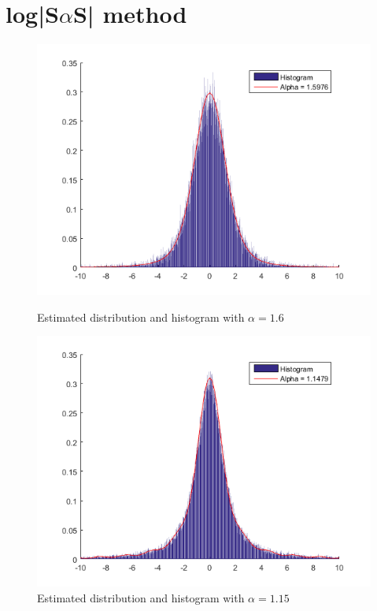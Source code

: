 \section{log|S$\alpha$S| method}
\begin{figure}[H]
    \centering
    \begin{minipage}{.5\textwidth}
        \centering
        \includegraphics[width=1\textwidth]{billeder/alpha1_6_logsas}
		\caption{Estimated distribution and histogram with $\alpha = 1.6$}
		\label{fig:logsas16}
    \end{minipage}%
    \begin{minipage}{0.5\textwidth}
        \centering
        \includegraphics[width=1\textwidth]{billeder/alpha1_15_logsas}
		\caption{Estimated distribution and histogram with $\alpha = 1.15$}
		\label{fig:logsas115}
    \end{minipage}
\end{figure}

